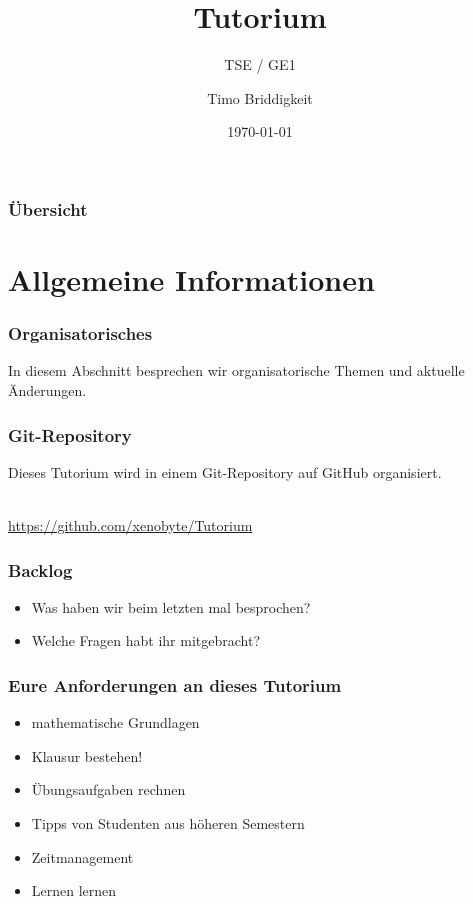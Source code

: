 \documentclass[german,ignorenonframetext]{beamer} %
\institute[MT -- HAW Hamburg]{HAW Hamburg\\ Fakultät TI, Dept.\ Informatik}
\title[Tutorium]{Tutorium}
\subtitle{TSE / GE1}
\author[Timo Briddigkeit]{Timo Briddigkeit}
\date{\today}
\begin{document}
\frame{\titlepage}

\begin{frame}
  \frametitle{Übersicht}
  \tableofcontents
\end{frame}

\section{Allgemeine Informationen} %
\begin{frame}
\frametitle{Organisatorisches}
In diesem Abschnitt besprechen wir organisatorische Themen und aktuelle Änderungen.
\end{frame}

\begin{frame}
\frametitle{Git-Repository}
Dieses Tutorium wird in einem Git-Repository auf GitHub organisiert.
\begin{center}
 \\
\url{https://github.com/xenobyte/Tutorium}
\end{center}
\end{frame}



\begin{frame}
\frametitle{Backlog}
\begin{itemize}
\item Was haben wir beim letzten mal besprochen?
\pause
\item Welche Fragen habt ihr mitgebracht?
\end{itemize}
\end{frame}


\begin{frame}
\frametitle{Eure Anforderungen an dieses Tutorium}
\begin{itemize}
\item mathematische Grundlagen
\pause
\item Klausur bestehen!
\pause
\item Übungsaufgaben rechnen
\pause
\item Tipps von Studenten aus höheren Semestern 
\pause
\item Zeitmanagement
\pause
\item Lernen lernen
\end{itemize}
\end{frame}
\end{document}
